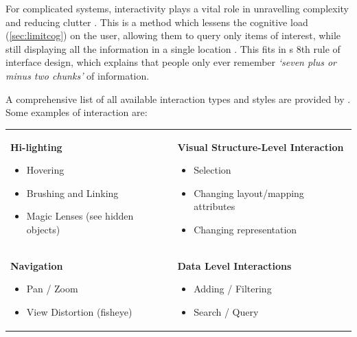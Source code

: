 For complicated systems, interactivity plays a vital role in unravelling complexity and reducing clutter \citep{interaction1}. This is a method which lessens the cognitive load (\autoref{sec:limitcog}) on the user, allowing them to query only items of interest, while still displaying all the information in a single location \citep{oneplace}. This fits in \cite{rule8}s 8th rule of interface design, which explains that people only ever remember \emph{`seven plus or minus two chunks'} of information.

A comprehensive list of all available interaction types and styles are provided by \cite{ch6}. Some examples of interaction are:\\

\begin{table}[h]
    \centering
    \begin{tabular}{p{}p{}}
\textbf{Hi-lighting}
\begin{itemize}
\item Hovering
\item Brushing and Linking
\item Magic Lenses (see hidden objects)
\end{itemize}
&
\textbf{Visual Structure-Level Interaction}
\begin{itemize}
\item Selection
\item Changing layout/mapping attributes
\item Changing representation
\end{itemize}
\\
\textbf{Navigation}
\begin{itemize}
\item Pan / Zoom
\item View Distortion (fisheye)
\end{itemize}
&
\textbf{Data Level Interactions}
\begin{itemize}
\item Adding / Filtering
\item Search / Query
\end{itemize}

\end{tabular}
    \label{tab:interactive}
\end{table}

